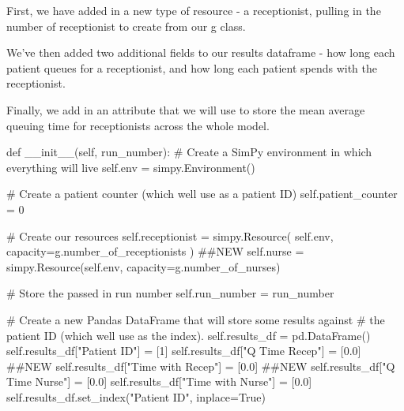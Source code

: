 \documentclass[
  letterpaper,
  DIV=11,
  numbers=noendperiod]{scrreprt}
\newenvironment{Shaded}{\begin{snugshade}}{\end{snugshade}}
\newcommand{\CommentTok}[1]{\textcolor[rgb]{0.37,0.37,0.37}{#1}}
\newcommand{\DecValTok}[1]{\textcolor[rgb]{0.68,0.00,0.00}{#1}}
\newcommand{\FloatTok}[1]{\textcolor[rgb]{0.68,0.00,0.00}{#1}}
\newcommand{\FunctionTok}[1]{\textcolor[rgb]{0.28,0.35,0.67}{#1}}
\newcommand{\KeywordTok}[1]{\textcolor[rgb]{0.00,0.23,0.31}{#1}}
\newcommand{\NormalTok}[1]{\textcolor[rgb]{0.00,0.23,0.31}{#1}}
\newcommand{\OperatorTok}[1]{\textcolor[rgb]{0.37,0.37,0.37}{#1}}
\newcommand{\StringTok}[1]{\textcolor[rgb]{0.13,0.47,0.30}{#1}}
\newcommand{\VariableTok}[1]{\textcolor[rgb]{0.07,0.07,0.07}{#1}}
\begin{document}
First, we have added in a new type of resource - a receptionist, pulling
in the number of receptionist to create from our g class.

We've then added two additional fields to our results dataframe - how
long each patient queues for a receptionist, and how long each patient
spends with the receptionist.

Finally, we add in an attribute that we will use to store the mean
average queuing time for receptionists across the whole model.

\begin{Shaded}
\begin{Highlighting}[]
\KeywordTok{def} \FunctionTok{\_\_init\_\_}\NormalTok{(}\VariableTok{self}\NormalTok{, run\_number):}
        \CommentTok{\# Create a SimPy environment in which everything will live}
        \VariableTok{self}\NormalTok{.env }\OperatorTok{=}\NormalTok{ simpy.Environment()}

        \CommentTok{\# Create a patient counter (which we\textquotesingle{}ll use as a patient ID)}
        \VariableTok{self}\NormalTok{.patient\_counter }\OperatorTok{=} \DecValTok{0}

        \CommentTok{\# Create our resources}
        \VariableTok{self}\NormalTok{.receptionist }\OperatorTok{=}\NormalTok{ simpy.Resource(}
            \VariableTok{self}\NormalTok{.env, capacity}\OperatorTok{=}\NormalTok{g.number\_of\_receptionists}
\NormalTok{        ) }\CommentTok{\#\#NEW}
        \VariableTok{self}\NormalTok{.nurse }\OperatorTok{=}\NormalTok{ simpy.Resource(}\VariableTok{self}\NormalTok{.env, capacity}\OperatorTok{=}\NormalTok{g.number\_of\_nurses)}

        \CommentTok{\# Store the passed in run number}
        \VariableTok{self}\NormalTok{.run\_number }\OperatorTok{=}\NormalTok{ run\_number}

        \CommentTok{\# Create a new Pandas DataFrame that will store some results against}
        \CommentTok{\# the patient ID (which we\textquotesingle{}ll use as the index).}
        \VariableTok{self}\NormalTok{.results\_df }\OperatorTok{=}\NormalTok{ pd.DataFrame()}
        \VariableTok{self}\NormalTok{.results\_df[}\StringTok{"Patient ID"}\NormalTok{] }\OperatorTok{=}\NormalTok{ [}\DecValTok{1}\NormalTok{]}
        \VariableTok{self}\NormalTok{.results\_df[}\StringTok{"Q Time Recep"}\NormalTok{] }\OperatorTok{=}\NormalTok{ [}\FloatTok{0.0}\NormalTok{] }\CommentTok{\#\#NEW}
        \VariableTok{self}\NormalTok{.results\_df[}\StringTok{"Time with Recep"}\NormalTok{] }\OperatorTok{=}\NormalTok{ [}\FloatTok{0.0}\NormalTok{] }\CommentTok{\#\#NEW}
        \VariableTok{self}\NormalTok{.results\_df[}\StringTok{"Q Time Nurse"}\NormalTok{] }\OperatorTok{=}\NormalTok{ [}\FloatTok{0.0}\NormalTok{]}
        \VariableTok{self}\NormalTok{.results\_df[}\StringTok{"Time with Nurse"}\NormalTok{] }\OperatorTok{=}\NormalTok{ [}\FloatTok{0.0}\NormalTok{]}
        \VariableTok{self}\NormalTok{.results\_df.set\_index(}\StringTok{"Patient ID"}\NormalTok{, inplace}\OperatorTok{=}\VariableTok{True}\NormalTok{)}


\end{Highlighting}
\end{Shaded}
\end{document}
